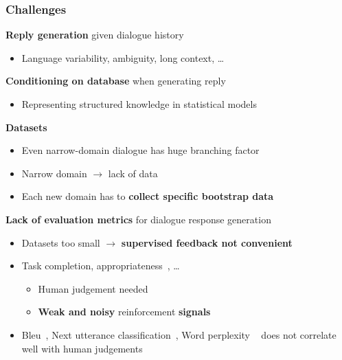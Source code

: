 \documentclass[10pt, compress,british,xcolor={svgnames,dvipsnames,x11names},trans]{beamer}
\begin{document}
\begin{frame}\frametitle{Challenges}
            {\bf \color{blue} Reply generation} given dialogue history
            \\
            \begin{itemize}
                \item Language variability, ambiguity, long context, \dots
            \end{itemize}
            {\bf \color{blue} Conditioning on database} when generating reply
            \\
            \begin{itemize}
                \item Representing structured knowledge in statistical models
            \end{itemize}
            {\bf \color{blue} Datasets}
            \\
            \begin{itemize}
                \item Even narrow-domain  dialogue has huge branching factor
                \item Narrow domain $\longrightarrow$ lack of data
                \item Each new domain has to {\bf collect specific bootstrap data}
            \end{itemize}
            {\bf \color{blue} Lack of evaluation metrics} for dialogue response generation
            \\
            \begin{itemize}
                \item Datasets too small $\longrightarrow$ {\bf supervised feedback not convenient}
                \item Task completion, appropriateness~\cite{bohus2007error}, \dots 
                \begin{itemize}
                    \item Human judgement needed \item {\bf Weak and noisy} reinforcement {\bf signals}
                \end{itemize}
            \item Bleu~\cite{papineni_bleu_2002}, Next utterance classification~\cite{lowe_evaluation_2016}, Word perplexity
                ~\cite{mikolov_recurrent_2010} 
                does not correlate well with human judgements
            \end{itemize}
\end{frame}
\end{document}
